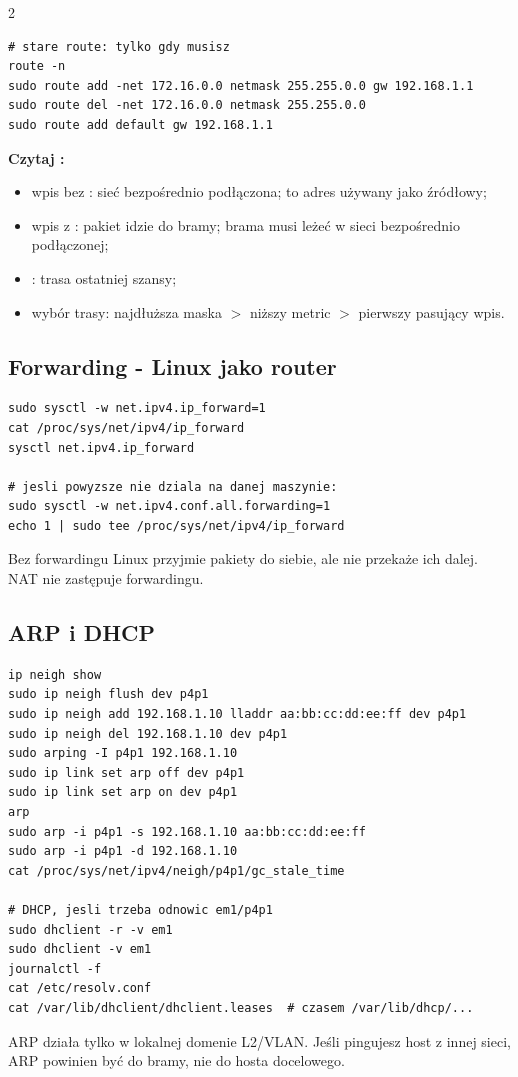 \documentclass[9pt,a4paper,landscape]{article}
\newcommand{\kw}[1]{\textbf{#1}}
\newcommand{\code}[1]{\texttt{\detokenize{#1}}}
\begin{document}
\begin{multicols*}{2}
\begin{lstlisting}
# stare route: tylko gdy musisz
route -n
sudo route add -net 172.16.0.0 netmask 255.255.0.0 gw 192.168.1.1
sudo route del -net 172.16.0.0 netmask 255.255.0.0
sudo route add default gw 192.168.1.1
\end{lstlisting}
\kw{Czytaj \code{ip route}:}
\begin{itemize}
  \item wpis bez \code{via}: sieć bezpośrednio podłączona; \code{src} to adres używany jako źródłowy;
  \item wpis z \code{via}: pakiet idzie do bramy; brama musi leżeć w sieci bezpośrednio podłączonej;
  \item \code{default}: trasa ostatniej szansy;
  \item wybór trasy: najdłuższa maska $>$ niższy metric $>$ pierwszy pasujący wpis.
\end{itemize}

\subsection{Forwarding - Linux jako router}
\begin{lstlisting}
sudo sysctl -w net.ipv4.ip_forward=1
cat /proc/sys/net/ipv4/ip_forward
sysctl net.ipv4.ip_forward

# jesli powyzsze nie dziala na danej maszynie:
sudo sysctl -w net.ipv4.conf.all.forwarding=1
echo 1 | sudo tee /proc/sys/net/ipv4/ip_forward
\end{lstlisting}
Bez forwardingu Linux przyjmie pakiety do siebie, ale nie przekaże ich dalej. NAT nie zastępuje forwardingu.

\subsection{ARP i DHCP}
\begin{lstlisting}
ip neigh show
sudo ip neigh flush dev p4p1
sudo ip neigh add 192.168.1.10 lladdr aa:bb:cc:dd:ee:ff dev p4p1
sudo ip neigh del 192.168.1.10 dev p4p1
sudo arping -I p4p1 192.168.1.10
sudo ip link set arp off dev p4p1
sudo ip link set arp on dev p4p1
arp
sudo arp -i p4p1 -s 192.168.1.10 aa:bb:cc:dd:ee:ff
sudo arp -i p4p1 -d 192.168.1.10
cat /proc/sys/net/ipv4/neigh/p4p1/gc_stale_time

# DHCP, jesli trzeba odnowic em1/p4p1
sudo dhclient -r -v em1
sudo dhclient -v em1
journalctl -f
cat /etc/resolv.conf
cat /var/lib/dhclient/dhclient.leases  # czasem /var/lib/dhcp/...
\end{lstlisting}
ARP działa tylko w lokalnej domenie L2/VLAN. Jeśli pingujesz host z innej sieci, ARP powinien być do bramy, nie do hosta docelowego.


\end{multicols*}
\end{document}
